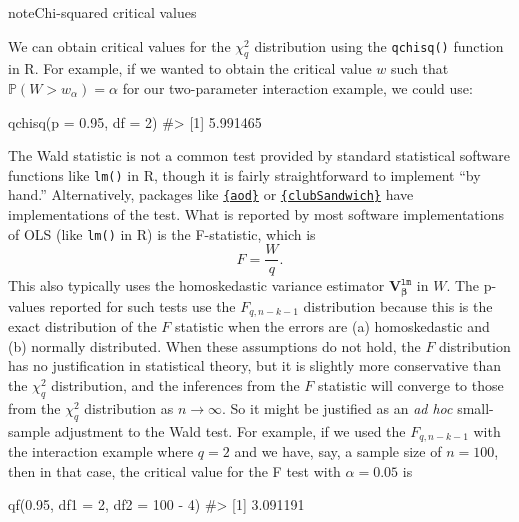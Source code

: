 \documentclass[
  13pt,
  letterpaper,
  DIV=11,
  numbers=noendperiod]{scrreprt}
\newenvironment{Shaded}{\begin{snugshade}}{\end{snugshade}}
\newcommand{\AttributeTok}[1]{\textcolor[rgb]{0.40,0.45,0.13}{#1}}
\newcommand{\CommentTok}[1]{\textcolor[rgb]{0.37,0.37,0.37}{#1}}
\newcommand{\DecValTok}[1]{\textcolor[rgb]{0.68,0.00,0.00}{#1}}
\newcommand{\FloatTok}[1]{\textcolor[rgb]{0.68,0.00,0.00}{#1}}
\newcommand{\FunctionTok}[1]{\textcolor[rgb]{0.28,0.35,0.67}{#1}}
\newcommand{\NormalTok}[1]{\textcolor[rgb]{0.00,0.23,0.31}{#1}}
\newcommand{\SpecialCharTok}[1]{\textcolor[rgb]{0.37,0.37,0.37}{#1}}
\newcommand{\mb}{\bm}
\renewcommand{\P}{\mathbb{P}}
\newcommand{\bfbeta}{\mb{\beta}}
\theoremstyle{plain}
\theoremstyle{plain}
\theoremstyle{definition}
\theoremstyle{definition}
\theoremstyle{remark}
\begin{document}
\begin{bookcallout}{note}{Chi-squared critical values}

We can obtain critical values for the \(\chi^2_q\) distribution using
the \texttt{qchisq()} function in R. For example, if we wanted to obtain
the critical value \(w\) such that \(\P(W > w_{\alpha}) = \alpha\) for
our two-parameter interaction example, we could use:

\begin{Shaded}
\begin{Highlighting}[]
\FunctionTok{qchisq}\NormalTok{(}\AttributeTok{p =} \FloatTok{0.95}\NormalTok{, }\AttributeTok{df =} \DecValTok{2}\NormalTok{)}
\CommentTok{\#\textgreater{} [1] 5.991465}
\end{Highlighting}
\end{Shaded}

\end{bookcallout}

The Wald statistic is not a common test provided by standard statistical
software functions like \texttt{lm()} in R, though it is fairly
straightforward to implement ``by hand.'' Alternatively, packages like
\href{https://cran.r-project.org/web/packages/aod/index.html}{\texttt{\{aod\}}}
or
\href{http://jepusto.github.io/clubSandwich/}{\texttt{\{clubSandwich\}}}
have implementations of the test. What is reported by most software
implementations of OLS (like \texttt{lm()} in R) is the F-statistic,
which is \[ 
F = \frac{W}{q}.
\] This also typically uses the homoskedastic variance estimator
\(\mb{V}^{\texttt{lm}}_{\bfbeta}\) in \(W\). The p-values reported for
such tests use the \(F_{q,n-k-1}\) distribution because this is the
exact distribution of the \(F\) statistic when the errors are (a)
homoskedastic and (b) normally distributed. When these assumptions do
not hold, the \(F\) distribution has no justification in statistical
theory, but it is slightly more conservative than the \(\chi^2_q\)
distribution, and the inferences from the \(F\) statistic will converge
to those from the \(\chi^2_q\) distribution as \(n\to\infty\). So it
might be justified as an \emph{ad hoc} small-sample adjustment to the
Wald test. For example, if we used the \(F_{q,n-k-1}\) with the
interaction example where \(q=2\) and we have, say, a sample size of
\(n = 100\), then in that case, the critical value for the F test with
\(\alpha = 0.05\) is

\begin{Shaded}
\begin{Highlighting}[]
\FunctionTok{qf}\NormalTok{(}\FloatTok{0.95}\NormalTok{, }\AttributeTok{df1 =} \DecValTok{2}\NormalTok{, }\AttributeTok{df2 =} \DecValTok{100} \SpecialCharTok{{-}} \DecValTok{4}\NormalTok{)}
\CommentTok{\#\textgreater{} [1] 3.091191}
\end{Highlighting}
\end{Shaded}
\end{document}
